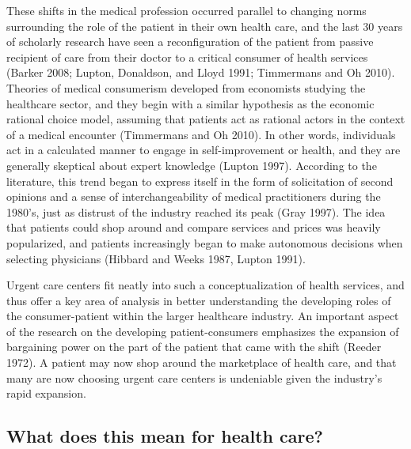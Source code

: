 \documentclass[12pt,twoside]{reedthesis}
\begin{document}
  These shifts in the medical profession occurred parallel to changing
  norms surrounding the role of the patient in their own health care, and
  the last 30 years of scholarly research have seen a reconfiguration of
  the patient from passive recipient of care from their doctor to a
  critical consumer of health services (Barker 2008; Lupton, Donaldson,
  and Lloyd 1991; Timmermans and Oh 2010). Theories of medical consumerism
  developed from economists studying the healthcare sector, and they begin
  with a similar hypothesis as the economic rational choice model,
  assuming that patients act as rational actors in the context of a
  medical encounter (Timmermans and Oh 2010). In other words, individuals
  act in a calculated manner to engage in self-improvement or health, and
  they are generally skeptical about expert knowledge (Lupton 1997).
  According to the literature, this trend began to express itself in the
  form of solicitation of second opinions and a sense of
  interchangeability of medical practitioners during the 1980's, just as
  distrust of the industry reached its peak (Gray 1997). The idea that
  patients could shop around and compare services and prices was heavily
  popularized, and patients increasingly began to make autonomous
  decisions when selecting physicians (Hibbard and Weeks 1987, Lupton
  1991).
  
  Urgent care centers fit neatly into such a conceptualization of health
  services, and thus offer a key area of analysis in better understanding
  the developing roles of the consumer-patient within the larger
  healthcare industry. An important aspect of the research on the
  developing patient-consumers emphasizes the expansion of bargaining
  power on the part of the patient that came with the shift (Reeder 1972).
  A patient may now shop around the marketplace of health care, and that
  many are now choosing urgent care centers is undeniable given the
  industry's rapid expansion.
  
  \subsection{What does this mean for health
  care?}\label{what-does-this-mean-for-health-care}
  
\end{document}
